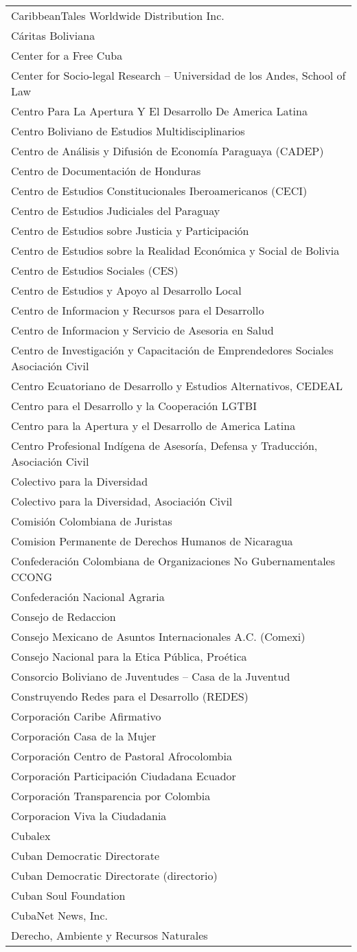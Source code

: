 \begin{longtable}[]{@{}l@{}}
CaribbeanTales Worldwide Distribution Inc.\tabularnewline
Cáritas Boliviana\tabularnewline
Center for a Free Cuba\tabularnewline
Center for Socio-legal Research -- Universidad de los Andes, School of
Law\tabularnewline
Centro Para La Apertura Y El Desarrollo De America Latina\tabularnewline
Centro Boliviano de Estudios Multidisciplinarios\tabularnewline
Centro de Análisis y Difusión de Economía Paraguaya
(CADEP)\tabularnewline
Centro de Documentación de Honduras\tabularnewline
Centro de Estudios Constitucionales Iberoamericanos
(CECI)\tabularnewline
Centro de Estudios Judiciales del Paraguay\tabularnewline
Centro de Estudios sobre Justicia y Participación\tabularnewline
Centro de Estudios sobre la Realidad Económica y Social de
Bolivia\tabularnewline
Centro de Estudios Sociales (CES)\tabularnewline
Centro de Estudios y Apoyo al Desarrollo Local\tabularnewline
Centro de Informacion y Recursos para el Desarrollo\tabularnewline
Centro de Informacion y Servicio de Asesoria en Salud\tabularnewline
Centro de Investigación y Capacitación de Emprendedores Sociales
Asociación Civil\tabularnewline
Centro Ecuatoriano de Desarrollo y Estudios Alternativos,
CEDEAL\tabularnewline
Centro para el Desarrollo y la Cooperación LGTBI\tabularnewline
Centro para la Apertura y el Desarrollo de America Latina\tabularnewline
Centro Profesional Indígena de Asesoría, Defensa y Traducción,
Asociación Civil\tabularnewline
Colectivo para la Diversidad\tabularnewline
Colectivo para la Diversidad, Asociación Civil\tabularnewline
Comisión Colombiana de Juristas\tabularnewline
Comision Permanente de Derechos Humanos de Nicaragua\tabularnewline
Confederación Colombiana de Organizaciones No Gubernamentales
CCONG\tabularnewline
Confederación Nacional Agraria\tabularnewline
Consejo de Redaccion\tabularnewline
Consejo Mexicano de Asuntos Internacionales A.C. (Comexi)\tabularnewline
Consejo Nacional para la Etica Pública, Proética\tabularnewline
Consorcio Boliviano de Juventudes -- Casa de la Juventud\tabularnewline
Construyendo Redes para el Desarrollo (REDES)\tabularnewline
Corporación Caribe Afirmativo\tabularnewline
Corporación Casa de la Mujer\tabularnewline
Corporación Centro de Pastoral Afrocolombia\tabularnewline
Corporación Participación Ciudadana Ecuador\tabularnewline
Corporación Transparencia por Colombia\tabularnewline
Corporacion Viva la Ciudadania\tabularnewline
Cubalex\tabularnewline
Cuban Democratic Directorate\tabularnewline
Cuban Democratic Directorate (directorio)\tabularnewline
Cuban Soul Foundation\tabularnewline
CubaNet News, Inc.\tabularnewline
Derecho, Ambiente y Recursos Naturales\tabularnewline

\end{longtable}
